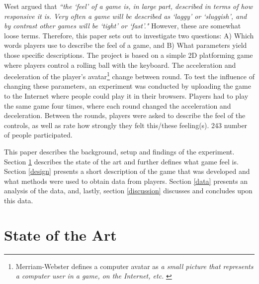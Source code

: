 West argued that \textit{``the `feel' of a game is, in large part, described in terms of how responsive it is. Very often a game will be described as `laggy' or `sluggish', and by contrast other games will be `tight' or `fast'."} \cite{measure_lag} However, these are somewhat loose terms. Therefore, this paper sets out to investigate two questions: A) Which words players use to describe the feel of a game, and B) What parameters yield those specific descriptions. The project is based on a simple 2D platforming game where players control a rolling ball with the keyboard. The acceleration and deceleration of the player's avatar\footnote{Merriam-Webster defines a computer avatar as \textit{a small picture that represents a computer user in a game, on the Internet, etc.} \cite{avatar}} change between round. To test the influence of changing these parameters, an experiment was conducted by uploading the game to the Internet where people could play it in their browsers. Players had to play the same game four times, where each round changed the acceleration and deceleration. Between the rounds, players  were asked to describe the feel of the controls, as well as rate how strongly they felt this/these feeling(s). 243 number of people participated.




This paper describes the background, setup and findings of the experiment. Section \ref{stateOfTheArt} describes the state of the art and further defines what game feel is. Section \ref{design} presents a short description of the game that was developed and what methods were used to obtain data from players. Section \ref{data} presents an analysis of the data, and, lastly, section \ref{discussion} discusses and concludes upon this data.

\section{State of the Art} \label{stateOfTheArt}

